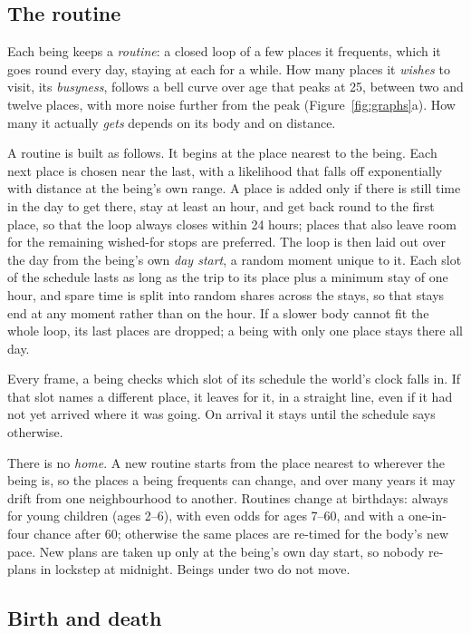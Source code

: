 \subsection{The routine}

Each being keeps a \emph{routine}: a closed loop of a few places it frequents, which it goes round every day, staying at each for a while. How many places it \emph{wishes} to visit, its \emph{busyness}, follows a bell curve over age that peaks at 25, between two and twelve places, with more noise further from the peak (Figure~\ref{fig:graphs}a). How many it actually \emph{gets} depends on its body and on distance.

A routine is built as follows. It begins at the place nearest to the being. Each next place is chosen near the last, with a likelihood that falls off exponentially with distance at the being's own range. A place is added only if there is still time in the day to get there, stay at least an hour, and get back round to the first place, so that the loop always closes within 24 hours; places that also leave room for the remaining wished-for stops are preferred. The loop is then laid out over the day from the being's own \emph{day start}, a random moment unique to it. Each slot of the schedule lasts as long as the trip to its place plus a minimum stay of one hour, and spare time is split into random shares across the stays, so that stays end at any moment rather than on the hour. If a slower body cannot fit the whole loop, its last places are dropped; a being with only one place stays there all day.

Every frame, a being checks which slot of its schedule the world's clock falls in. If that slot names a different place, it leaves for it, in a straight line, even if it had not yet arrived where it was going. On arrival it stays until the schedule says otherwise.

There is no \emph{home}. A new routine starts from the place nearest to wherever the being is, so the places a being frequents can change, and over many years it may drift from one neighbourhood to another. Routines change at birthdays: always for young children (ages 2--6), with even odds for ages 7--60, and with a one-in-four chance after 60; otherwise the same places are re-timed for the body's new pace. New plans are taken up only at the being's own day start, so nobody re-plans in lockstep at midnight. Beings under two do not move.

\subsection{Birth and death}

